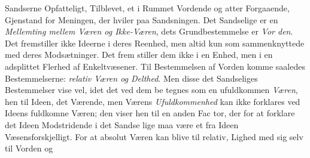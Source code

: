 \documentclass[12pt,a4paper]{book}
\newcommand{\gk}[1]{\textit{#1}}
\begin{document}
Sandserne Opfatteligt, Tilblevet, et i Rummet Vordende og
atter Forgaaende, Gjenstand for Meningen, der hviler paa
Sandsningen. Det Sandselige er en \emph{Mellemting mellem
Væren og Ikke-Væren}, dets Grundbestemmelse er \emph{Vor\-%
den}. Det fremstiller ikke Ideerne i deres Reenhed, men altid
kun som sammenknyttede med deres Modsætninger. Det frem\-%
stiller dem ikke i en Enhed, men i en adsplittet Flerhed af
Enkeltvæsener. Til Bestemmelsen af Vorden komme saaledes
Bestemmelserne: \emph{relativ Væren og Delthed}. Men disse
det Sandseliges Bestemmelser vise vel, idet det ved dem be\-%
tegnes som en ufuldkommen \emph{Væren}, hen til Ideen, det
Værende, men Værens \emph{Ufuldkommenhed} kan ikke forklares
ved Ideens fuldkomne Væren; den viser hen til en anden Fac\-%
tor, der for at forklare det Ideen Modstridende i det Sandse\-%
lige maa være et fra Ideen Væsensforskjelligt. For at absolut
Væren kan blive til relativ, Lighed med sig selv til Vorden og
\end{document}
